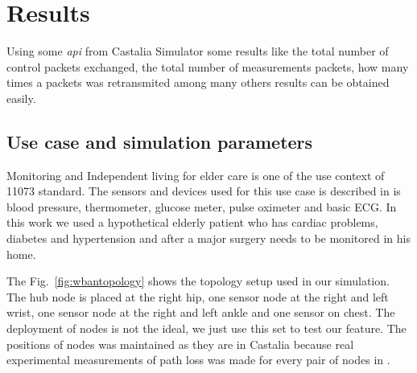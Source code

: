 \section{Results}\label{results}
Using some \textit{api} from Castalia Simulator some results like the total number of control packets exchanged, the total number of measurements packets, how many times a packets was retransmited among many others results can be obtained easily.

\subsection{Use case and simulation parameters}

Monitoring and Independent living for elder care is one of the use context of 11073 standard. The sensors and devices used for this use case is described in \cite{b3} is blood pressure, thermometer, glucose meter, pulse oximeter and basic ECG. In this work we used a hypothetical elderly patient who has cardiac problems, diabetes and hypertension and  after a major surgery needs to be monitored in his home.

The Fig.~\ref{fig:wbantopology} shows the topology setup used in our simulation. The hub node is placed at the right hip, one sensor node at the right and left wrist, one sensor node at the right and left ankle and one sensor on chest. The deployment of nodes is not the ideal, we just use this set to test our feature. The positions of nodes was maintained as they are in Castalia because real experimental measurements of path loss was made for every pair of nodes in \cite{b4}.

